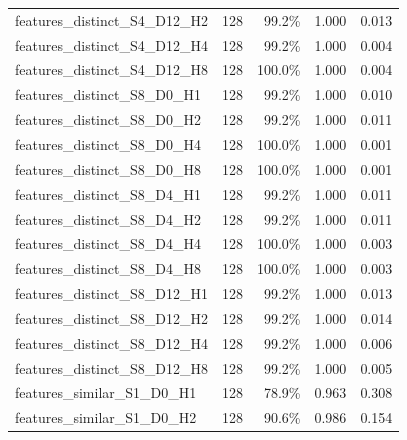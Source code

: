 \documentclass[11pt]{article}
\begin{document}
\begin{longtable}{p{}rrrr}
features\_\allowbreak{}distinct\_\allowbreak{}S4\_\allowbreak{}D12\_\allowbreak{}H2 & 128 & 99.2\% & 1.000 & 0.013\\
features\_\allowbreak{}distinct\_\allowbreak{}S4\_\allowbreak{}D12\_\allowbreak{}H4 & 128 & 99.2\% & 1.000 & 0.004\\
features\_\allowbreak{}distinct\_\allowbreak{}S4\_\allowbreak{}D12\_\allowbreak{}H8 & 128 & 100.0\% & 1.000 & 0.004\\
features\_\allowbreak{}distinct\_\allowbreak{}S8\_\allowbreak{}D0\_\allowbreak{}H1 & 128 & 99.2\% & 1.000 & 0.010\\
features\_\allowbreak{}distinct\_\allowbreak{}S8\_\allowbreak{}D0\_\allowbreak{}H2 & 128 & 99.2\% & 1.000 & 0.011\\
features\_\allowbreak{}distinct\_\allowbreak{}S8\_\allowbreak{}D0\_\allowbreak{}H4 & 128 & 100.0\% & 1.000 & 0.001\\
features\_\allowbreak{}distinct\_\allowbreak{}S8\_\allowbreak{}D0\_\allowbreak{}H8 & 128 & 100.0\% & 1.000 & 0.001\\
features\_\allowbreak{}distinct\_\allowbreak{}S8\_\allowbreak{}D4\_\allowbreak{}H1 & 128 & 99.2\% & 1.000 & 0.011\\
features\_\allowbreak{}distinct\_\allowbreak{}S8\_\allowbreak{}D4\_\allowbreak{}H2 & 128 & 99.2\% & 1.000 & 0.011\\
features\_\allowbreak{}distinct\_\allowbreak{}S8\_\allowbreak{}D4\_\allowbreak{}H4 & 128 & 100.0\% & 1.000 & 0.003\\
features\_\allowbreak{}distinct\_\allowbreak{}S8\_\allowbreak{}D4\_\allowbreak{}H8 & 128 & 100.0\% & 1.000 & 0.003\\
features\_\allowbreak{}distinct\_\allowbreak{}S8\_\allowbreak{}D12\_\allowbreak{}H1 & 128 & 99.2\% & 1.000 & 0.013\\
features\_\allowbreak{}distinct\_\allowbreak{}S8\_\allowbreak{}D12\_\allowbreak{}H2 & 128 & 99.2\% & 1.000 & 0.014\\
features\_\allowbreak{}distinct\_\allowbreak{}S8\_\allowbreak{}D12\_\allowbreak{}H4 & 128 & 99.2\% & 1.000 & 0.006\\
features\_\allowbreak{}distinct\_\allowbreak{}S8\_\allowbreak{}D12\_\allowbreak{}H8 & 128 & 99.2\% & 1.000 & 0.005\\
features\_\allowbreak{}similar\_\allowbreak{}S1\_\allowbreak{}D0\_\allowbreak{}H1 & 128 & 78.9\% & 0.963 & 0.308\\
features\_\allowbreak{}similar\_\allowbreak{}S1\_\allowbreak{}D0\_\allowbreak{}H2 & 128 & 90.6\% & 0.986 & 0.154\\

\end{longtable}
\end{document}

